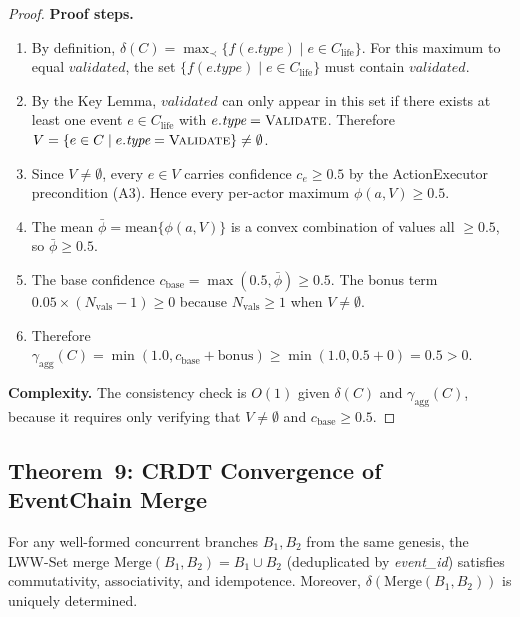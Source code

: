 \begin{proof}
\textbf{Proof steps.}
\begin{enumerate}[label=Step~\arabic*:,leftmargin=2em]
    \item By definition, $\delta(C) = \max_{\prec}\{f(e.\textit{type}) \mid e \in C_{\text{life}}\}$. For this maximum to equal $\textit{validated}$, the set $\{f(e.\textit{type}) \mid e \in C_{\text{life}}\}$ must contain $\textit{validated}$.
    \item By the Key Lemma, $\textit{validated}$ can only appear in this set if there exists at least one event $e \in C_{\text{life}}$ with $e.\textit{type} = \textsc{Validate}$. Therefore $V = \{e \in C \mid e.\textit{type} = \textsc{Validate}\} \neq \emptyset$.
    \item Since $V \neq \emptyset$, every $e \in V$ carries confidence $c_e \geq 0.5$ by the ActionExecutor precondition (A3). Hence every per-actor maximum $\phi(a, V) \geq 0.5$.
    \item The mean $\bar{\phi} = \text{mean}\{\phi(a, V)\}$ is a convex combination of values all $\geq 0.5$, so $\bar{\phi} \geq 0.5$.
    \item The base confidence $c_{\text{base}} = \max(0.5, \bar{\phi}) \geq 0.5$. The bonus term $0.05 \times (N_{\text{vals}} - 1) \geq 0$ because $N_{\text{vals}} \geq 1$ when $V \neq \emptyset$.
    \item Therefore $\gamma_{\text{agg}}(C) = \min(1.0, c_{\text{base}} + \text{bonus}) \geq \min(1.0, 0.5 + 0) = 0.5 > 0$.
\end{enumerate}

\textbf{Complexity.} The consistency check is $O(1)$ given $\delta(C)$ and $\gamma_{\text{agg}}(C)$, because it requires only verifying that $V \neq \emptyset$ and $c_{\text{base}} \geq 0.5$.
\end{proof}

\subsection{Theorem~9: CRDT Convergence of EventChain Merge}

\begin{theorem}\label{thm:crdt-convergence-appendix}
For any well-formed concurrent branches $B_1, B_2$ from the same genesis, the LWW-Set merge $\text{Merge}(B_1, B_2) = B_1 \cup B_2$ (deduplicated by \textit{event\_id}) satisfies commutativity, associativity, and idempotence. Moreover, $\delta(\text{Merge}(B_1, B_2))$ is uniquely determined.
\end{theorem}

